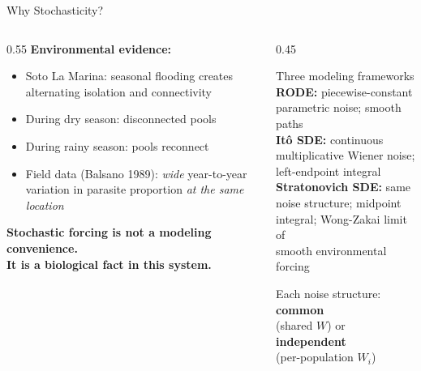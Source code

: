 \documentclass{beamer}
\begin{document}
\begin{frame}{Why Stochasticity?}

  \footnotesize


  \begin{columns}[T]
    \begin{column}{0.55\textwidth}
      \textbf{Environmental evidence:}
      \begin{itemize}
        \item Soto La Marina: seasonal flooding creates alternating isolation and connectivity
        \item During dry season: disconnected pools
        \item During rainy season: pools reconnect
        \item Field data (Balsano 1989): \emph{wide} year-to-year variation in parasite proportion \emph{at the same location}
      \end{itemize}

      \vspace{0.3cm}
      \textbf{Stochastic forcing is not a modeling convenience.\\
      It is a biological fact in this system.}
    \end{column}

    \begin{column}{0.45\textwidth}
      \begin{block}{Three modeling frameworks}
        \textbf{RODE:} piecewise-constant\\
        parametric noise; smooth paths\\[6pt]
        \textbf{It\^{o} SDE:} continuous\\
        multiplicative Wiener noise;\\
        left-endpoint integral\\[6pt]
        \textbf{Stratonovich SDE:} same\\
        noise structure; midpoint\\
        integral; Wong-Zakai limit of\\
        smooth environmental forcing
      \end{block}

      \vspace{0.2cm}
      Each noise structure: \textbf{common}\\
      (shared $W$) or \textbf{independent}\\
      (per-population $W_i$)
    \end{column}
  \end{columns}

\end{frame}
\end{document}
